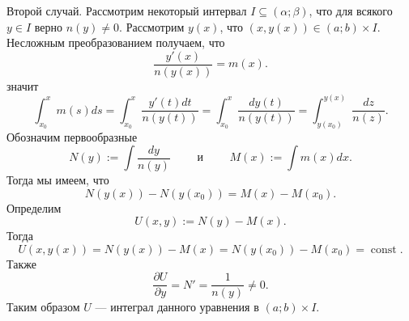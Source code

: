 \documentclass[12pt,a4paper]{article}
\DeclareMathOperator{\const}{const}
\begin{document}
    Второй случай. Рассмотрим некоторый интервал $I \subseteq (\alpha; \beta)$, что для всякого $y \in I$ верно $n(y) \neq 0$. Рассмотрим $y(x)$, что $(x, y(x)) \in (a; b) \times I$. Несложным преобразованием получаем, что
    \[\frac{y'(x)}{n(y(x))} = m(x).\]
    значит
    \[
        \int_{x_0}^x m(s) ds
        = \int_{x_0}^x \frac{y'(t) dt}{n(y(t))}
        = \int_{x_0}^x \frac{dy(t)}{n(y(t))}
        = \int_{y(x_0)}^{y(x)} \frac{dz}{n(z)}.
    \]
    Обозначим первообразные
    \[N(y) := \int \frac{dy}{n(y)} \qquad \text{ и } \qquad M(x) := \int m(x) dx.\]
    Тогда мы имеем, что
    \[N(y(x)) - N(y(x_0)) = M(x) - M(x_0).\]
    Определим
    \[U(x, y) := N(y) - M(x).\]
    Тогда
    \[U(x, y(x)) = N(y(x)) - M(x) = N(y(x_0)) - M(x_0) = \const.\]
    Также
    \[\frac{\partial U}{\partial y} = N' = \frac{1}{n(y)} \neq 0.\]
    Таким образом $U$ --- интеграл данного уравнения в $(a; b) \times I$.
\end{document}
